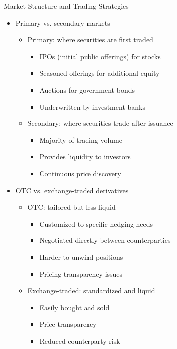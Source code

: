 \documentclass[10pt,handout]{beamer}
\begin{document}
\begin{frame}{Market Structure and Trading Strategies}
  \begin{itemize}[<+->]
    \item Primary vs. secondary markets
      \begin{itemize}
        \item Primary: where securities are first traded
          \begin{itemize}
            \item IPOs (initial public offerings) for stocks
            \item Seasoned offerings for additional equity
            \item Auctions for government bonds
            \item Underwritten by investment banks
          \end{itemize}
        \item Secondary: where securities trade after issuance
          \begin{itemize}
            \item Majority of trading volume
            \item Provides liquidity to investors
            \item Continuous price discovery
          \end{itemize}
      \end{itemize}
    \item OTC vs. exchange-traded derivatives
      \begin{itemize}
        \item OTC: tailored but less liquid
          \begin{itemize}
            \item Customized to specific hedging needs
            \item Negotiated directly between counterparties
            \item Harder to unwind positions
            \item Pricing transparency issues
          \end{itemize}
        \item Exchange-traded: standardized and liquid
          \begin{itemize}
            \item Easily bought and sold
            \item Price transparency
            \item Reduced counterparty risk
          \end{itemize}
      \end{itemize}
  \end{itemize}
\end{frame}
\end{document}
